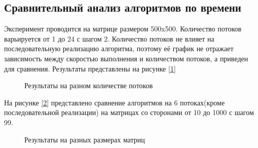\documentclass{article}
\begin{document}
	\subsection{Сравнительный анализ алгоритмов по времени}
	Эксперимент проводится на матрице размером 500x500. Количество потоков варьируется от 1 до 24 с шагом 2. Количество потоков не влияет на последовательную реализацию алгоритма, поэтому её график не отражает зависимость между скоростью выполнения и количеством потоков, а приведен для сравнения.  Результаты представлены на рисунке \hyperref[test_mylt]{[\ref{test_mylt}]}
	\begin{figure}[h!]
		 	\caption{Результаты на разном количестве потоков}
		 	\label{test_mylt}
	 	\end{figure}
	\newpage
	На рисунке \hyperref[test_fix]{[\ref{test_fix}]} представлено сравнение алгоритмов на 6 потоках(кроме последовательной реализации) на матрицах со сторонами от 10 до 1000 с шагом 99.
	\begin{figure}[h!]
		 	\caption{Результаты на разных размерах матриц}
		 	\label{test_fix}
	 	\end{figure}
	\newpage
\end{document}

